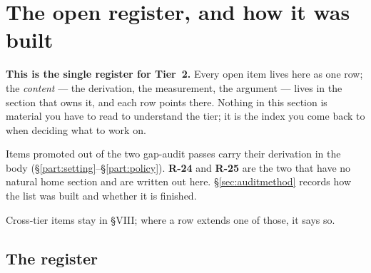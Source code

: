 %
%
%

\section{The open register, and how it was built}
\label{part:register}

\textbf{This is the single register for Tier~2.} Every open item lives here as
one row; the \emph{content} --- the derivation, the measurement, the argument
--- lives in the section that owns it, and each row points there. Nothing in
this section is material you have to read to understand the tier; it is the
index you come back to when deciding what to work on.

Items promoted out of the two gap-audit passes carry their derivation in the
body (\S\ref{part:setting}--\S\ref{part:policy}). \textbf{R-24} and
\textbf{R-25} are the two that have no natural home section and are written out
here. \S\ref{sec:auditmethod} records how the list was built and whether it is
finished.

Cross-tier items stay in  \S VIII; where a row extends one of
those, it says so.

\subsection{The register}
\label{sec:register}

